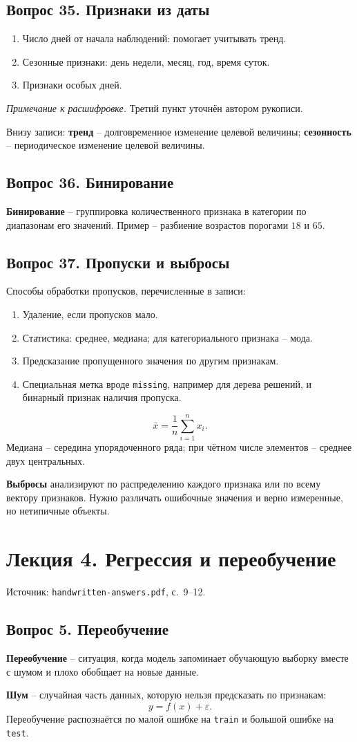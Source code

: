 \documentclass[11pt,a4paper]{article}
\newcommand{\source}[1]{{\small\color{muted}Источник: \texttt{handwritten-answers.pdf}, с.~#1.}\par}
\newcommand{\ednote}[1]{\par{\small\color{muted}\textit{Примечание к расшифровке.} #1}\par}
\newcommand{\question}[2]{\subsection{Вопрос #1. #2}}
\newcommand{\code}[1]{\texttt{#1}}
\begin{document}
\question{35}{Признаки из даты}
\begin{enumerate}
\item Число дней от начала наблюдений: помогает учитывать тренд.
\item Сезонные признаки: день недели, месяц, год, время суток.
\item Признаки особых дней.
\end{enumerate}
\ednote{Третий пункт уточнён автором рукописи.}

Внизу записи: \textbf{тренд} -- долговременное изменение целевой величины;
\textbf{сезонность} -- периодическое изменение целевой величины.

\question{36}{Бинирование}
\textbf{Бинирование} -- группировка количественного признака в категории
по диапазонам его значений. Пример -- разбиение возрастов порогами $18$ и $65$.

\question{37}{Пропуски и выбросы}
Способы обработки пропусков, перечисленные в записи:
\begin{enumerate}
\item Удаление, если пропусков мало.
\item Статистика: среднее, медиана; для категориального признака -- мода.
\item Предсказание пропущенного значения по другим признакам.
\item Специальная метка вроде \code{missing}, например для дерева решений,
и бинарный признак наличия пропуска.
\end{enumerate}
\[
 \bar x=\frac1n\sum_{i=1}^{n}x_i.
\]
Медиана -- середина упорядоченного ряда; при чётном числе элементов --
среднее двух центральных.

\textbf{Выбросы} анализируют по распределению каждого признака
или по всему вектору признаков. Нужно различать ошибочные значения
и верно измеренные, но нетипичные объекты.

\clearpage
\section{Лекция 4. Регрессия и переобучение}
\source{9--12}

\question{5}{Переобучение}
\textbf{Переобучение} -- ситуация, когда модель запоминает обучающую выборку
вместе с шумом и плохо обобщает на новые данные.

\textbf{Шум} -- случайная часть данных, которую нельзя предсказать по признакам:
\[
 y=f(x)+\varepsilon.
\]
Переобучение распознаётся по малой ошибке на \code{train}
и большой ошибке на \code{test}.
\end{document}
